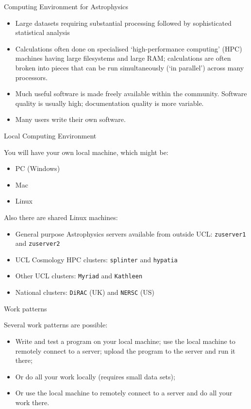 \documentclass{beamer}
\begin{document}
\begin{frame}{Computing Environment for Astrophysics}
  \begin{itemize}
  \item Large datasets requiring substantial processing followed by sophisticated statistical analysis
  \item Calculations often done on specialised `high-performance computing' (HPC) machines having large filesystems and large RAM; calculations are often broken into pieces that can be run simultaneously (`in parallel') across many processors.
  \item Much useful software is made freely available within the community. Software quality is usually high; documentation quality is more variable.
  \item Many users write their own software.
  \end{itemize}
\end{frame}

\begin{frame}{Local Computing Environment}
  \begin{block}{You will have your own local machine, which might be:}
    \begin{itemize}
      \item PC (Windows)
      \item Mac
      \item Linux
    \end{itemize}
  \end{block}
  \begin{block}{Also there are shared Linux machines:}
    \begin{itemize}
      \item General purpose Astrophysics servers available from outside UCL: \alert{\texttt{zuserver1}} and \alert{\texttt{zuserver2}}
      \item UCL Cosmology HPC clusters: \alert{\texttt{splinter}} and \alert{\texttt{hypatia}}
      \item Other UCL clusters: \alert{\texttt{Myriad}} and \alert{\texttt{Kathleen}}
      \item National clusters: \alert{\texttt{DiRAC}} (UK) and \alert{\texttt{NERSC}} (US)
    \end{itemize}
  \end{block}
\end{frame}

\begin{frame}{Work patterns}
  \begin{block}{Several work patterns are possible:}
    \begin{itemize}
      \item Write and test a program on your local machine; use the local machine to remotely connect to a server; upload the program to the server and run it there;
      \item Or do all your work locally (requires small data sets);
      \item Or use the local machine to remotely connect to a server and do all your work there.
    \end{itemize}
  \end{block}
\end{frame}
\end{document}
